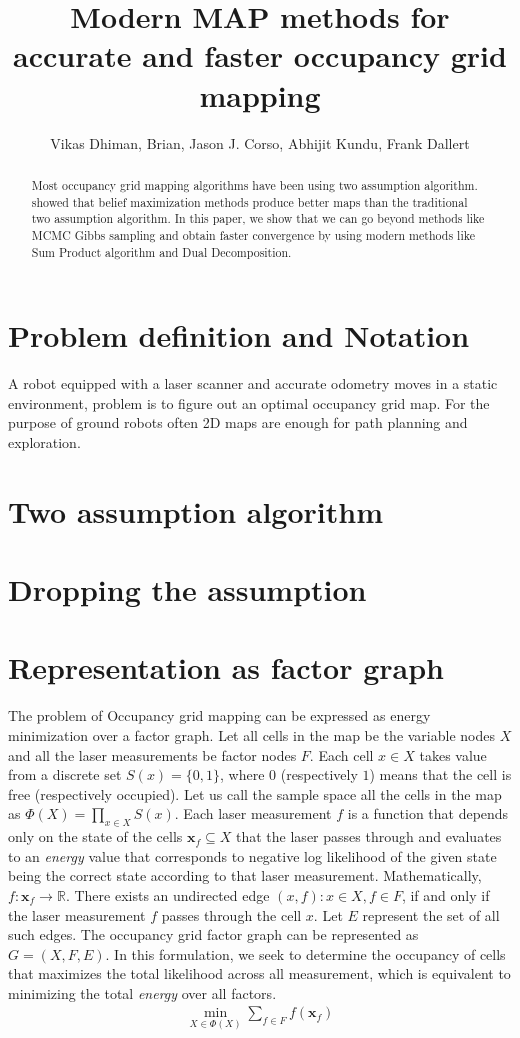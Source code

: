 \documentclass[letterpaper, 10 pt, conference]{ieeeconf} %
\title{Modern MAP methods for accurate and faster occupancy grid mapping}
\author{Vikas Dhiman, Brian, Jason J. Corso, Abhijit Kundu, Frank Dallert}
\newcommand{\vect}[1]{\mathbf{#1}}
\newcommand{\field}[1]{\mathbb{#1}}
\newcommand{\Real}[0]{\field{R}}
\begin{document}
\maketitle
\begin{abstract}
  Most occupancy grid mapping algorithms have been using two assumption
  algorithm.  \cite{merali2013icra} showed that belief maximization methods
  produce better maps than the traditional two assumption algorithm.  In this
  paper, we show that we can go beyond methods like MCMC Gibbs sampling and
  obtain faster convergence by using modern methods like Sum Product algorithm
  and Dual Decomposition.
\end{abstract}
\section{Problem definition and Notation}
A robot equipped with a laser scanner and accurate odometry moves in a static
environment, problem is to figure out an optimal occupancy grid map. For the
purpose of ground robots often 2D maps are enough for path planning and
exploration. 
\section{Two assumption algorithm}
\section{Dropping the assumption}
\section{Representation as factor graph}
The problem of Occupancy grid mapping can be expressed as energy minimization
over a factor graph. Let all cells in the map be the variable nodes $X$ and all
the laser measurements be factor nodes $F$. Each cell $x \in X$ takes value
from a discrete set $S(x) = \{0, 1\}$, where $0$ (respectively $1$) means that
the cell is free (respectively occupied). Let us call the sample space all the cells in the map
as $\Phi(X) = \prod_{x \in X} S(x)$.
Each laser measurement $f$ is a
function that depends only on the state of the cells $\vect{x}_f \subseteq X$
that the laser passes through and evaluates to an \emph{energy} value that
corresponds to negative
log likelihood of the given state being the correct state according to that
laser measurement. Mathematically, $f : \vect{x}_f \rightarrow \Real$. There
exists an undirected edge $(x, f) : x \in X, f \in F$, if and only if the laser
measurement $f$ passes through the cell $x$. Let $E$ represent the set of all
such edges. The occupancy grid factor graph can be represented as $G = (X, F,
E)$. In this formulation, we seek to determine the occupancy of cells that
maximizes the total likelihood across all measurement, which is equivalent to
minimizing the total \emph{energy} over all factors.
\begin{align}
  \min_{X \in \Phi(X)} \sum_{f \in F} f(\vect{x}_f)
\end{align}
\end{document}
